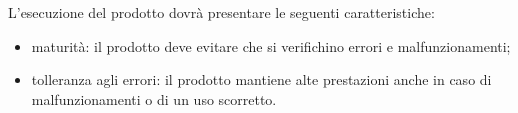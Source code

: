 L'esecuzione del prodotto dovrà presentare le seguenti caratteristiche:

\begin{itemize}
    \item maturità: il prodotto deve evitare che si verifichino errori e malfunzionamenti;
    \item tolleranza agli errori: il prodotto mantiene alte prestazioni anche in caso di malfunzionamenti o di un uso scorretto.
\end{itemize}